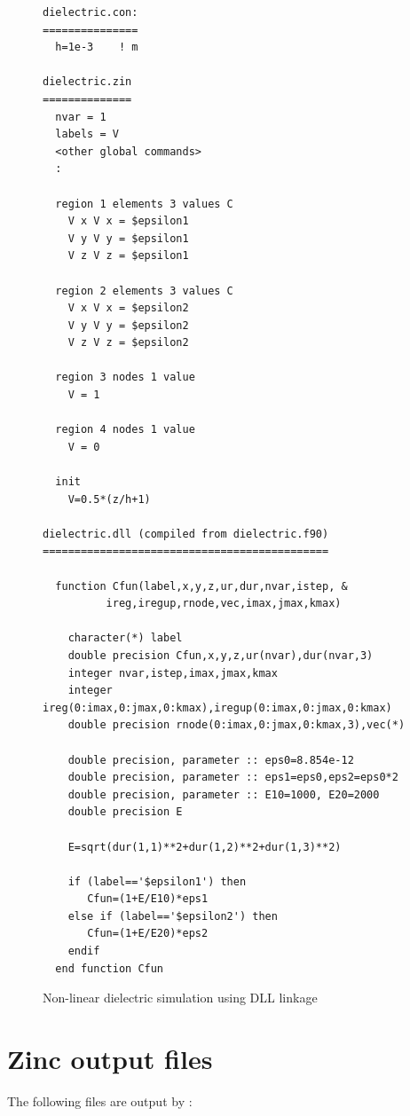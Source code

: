 \documentclass[a4paper,twoside,11pt]{book}
\begin{document}
\begin{figure}

\begin{scriptsize}
\begin{verbatim}
dielectric.con:
===============
  h=1e-3    ! m

dielectric.zin
==============
  nvar = 1
  labels = V
  <other global commands>
  :

  region 1 elements 3 values C
    V x V x = $epsilon1
    V y V y = $epsilon1
    V z V z = $epsilon1

  region 2 elements 3 values C
    V x V x = $epsilon2
    V y V y = $epsilon2
    V z V z = $epsilon2

  region 3 nodes 1 value
    V = 1

  region 4 nodes 1 value
    V = 0

  init
    V=0.5*(z/h+1)

dielectric.dll (compiled from dielectric.f90)
=============================================

  function Cfun(label,x,y,z,ur,dur,nvar,istep, &
          ireg,iregup,rnode,vec,imax,jmax,kmax)
         
    character(*) label
    double precision Cfun,x,y,z,ur(nvar),dur(nvar,3)
    integer nvar,istep,imax,jmax,kmax
    integer ireg(0:imax,0:jmax,0:kmax),iregup(0:imax,0:jmax,0:kmax)
    double precision rnode(0:imax,0:jmax,0:kmax,3),vec(*)

    double precision, parameter :: eps0=8.854e-12
    double precision, parameter :: eps1=eps0,eps2=eps0*2
    double precision, parameter :: E10=1000, E20=2000
    double precision E

    E=sqrt(dur(1,1)**2+dur(1,2)**2+dur(1,3)**2)

    if (label=='$epsilon1') then
       Cfun=(1+E/E10)*eps1
    else if (label=='$epsilon2') then
       Cfun=(1+E/E20)*eps2
    endif
  end function Cfun

\end{verbatim}
\end{scriptsize}
  \caption{Non-linear dielectric simulation using DLL linkage}
  \label{nlf90ex}  
\end{figure}

\section{Zinc output files}

The following files are output by \zinc:
\end{document}
